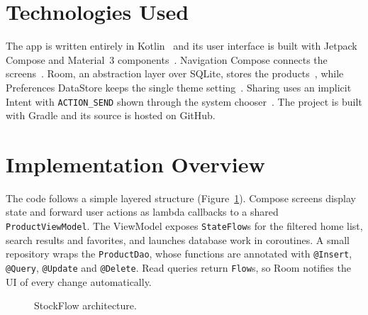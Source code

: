 \documentclass[sigconf,nonacm]{acmart}
\begin{document}
\section{Technologies Used}
The app is written entirely in Kotlin~\cite{kotlin-lambdas} and its user interface
is built with Jetpack Compose and Material~3 components~\cite{compose,material3}.
Navigation Compose connects the screens~\cite{navigation}. Room, an abstraction
layer over SQLite, stores the products~\cite{room}, while Preferences DataStore
keeps the single theme setting~\cite{datastore}. Sharing uses an implicit Intent
with \texttt{ACTION\_SEND} shown through the system chooser~\cite{intents}. The
project is built with Gradle and its source is hosted on GitHub.

\section{Implementation Overview}
The code follows a simple layered structure (Figure~\ref{fig:arch}). Compose screens
display state and forward user actions as lambda callbacks to a shared
\texttt{ProductViewModel}. The ViewModel exposes \texttt{StateFlow}s for the
filtered home list, search results and favorites, and launches database work in
coroutines. A small repository wraps the \texttt{ProductDao}, whose functions are
annotated with \texttt{@Insert}, \texttt{@Query}, \texttt{@Update} and
\texttt{@Delete}. Read queries return \texttt{Flow}s, so Room notifies the UI of
every change automatically.

\begin{figure}[h]
\centering
{}
\caption{StockFlow architecture.}
\label{fig:arch}
\end{figure}
\end{document}
